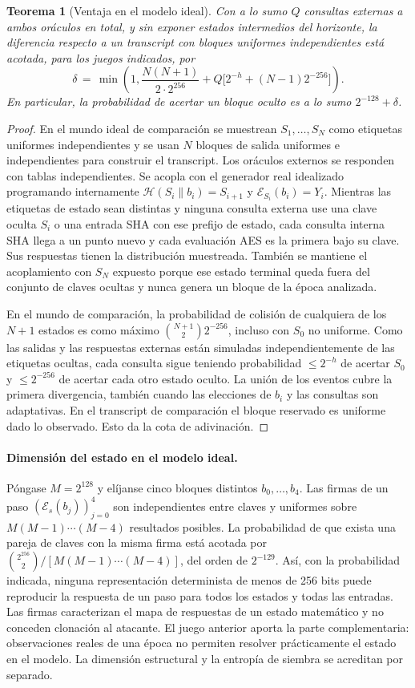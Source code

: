 \documentclass[11pt,a4paper]{article}
\newtheorem{theorem}{Teorema}
\begin{document}
\begin{theorem}[Ventaja en el modelo ideal]
Con a lo sumo $Q$ consultas externas a ambos oráculos en total,
y sin exponer estados intermedios del horizonte, la diferencia
respecto a un transcript con bloques uniformes independientes
está acotada, para los juegos indicados, por
\[
\delta\,=\,\min\left(1, \frac{N(N+1)}{2\cdot2^{256}}
 +Q\big[2^{-h}+(N-1)2^{-256}\big]\right).
\]
En particular, la probabilidad de acertar un bloque oculto es
a lo sumo $2^{-128}+\delta$.
\end{theorem}
\begin{proof}
En el mundo ideal de comparación se muestrean $S_1,\ldots,S_N$
como etiquetas uniformes independientes y se usan $N$ bloques
de salida uniformes e independientes para construir el
transcript. Los oráculos externos se responden con tablas
independientes. Se acopla con el generador real idealizado
programando internamente $\mathcal H(S_i\|b_i)=S_{i+1}$ y
$\mathcal E_{S_i}(b_i)=Y_i$. Mientras las etiquetas de estado sean
distintas y ninguna consulta externa use una clave oculta $S_i$
o una entrada SHA con ese prefijo de estado, cada consulta
interna SHA llega a un punto nuevo y cada evaluación AES es la
primera bajo su clave. Sus respuestas tienen la distribución
muestreada. También se mantiene el acoplamiento con $S_N$
expuesto porque ese estado terminal queda fuera del conjunto
de claves ocultas y nunca genera un bloque de la época analizada.

En el mundo de comparación, la probabilidad de colisión de
cualquiera de los $N+1$ estados es como máximo
$\binom{N+1}{2}2^{-256}$, incluso con $S_0$ no uniforme.
Como las salidas y las respuestas externas están simuladas
independientemente de las etiquetas ocultas, cada consulta
sigue teniendo probabilidad $\le2^{-h}$ de acertar $S_0$
y $\le2^{-256}$ de acertar cada otro estado oculto. La unión
de los eventos cubre la primera divergencia, también cuando
las elecciones de $b_i$ y las consultas son adaptativas.
En el transcript de comparación el bloque reservado es
uniforme dado lo observado. Esto da la cota de adivinación.
\end{proof}

\paragraph{Dimensión del estado en el modelo ideal.}
Póngase $M=2^{128}$ y elíjanse cinco bloques distintos $b_0,\ldots,b_4$.
Las firmas de un paso $(\mathcal E_s(b_j))_{j=0}^4$
son independientes entre claves y uniformes sobre $M(M-1)\cdots(M-4)$
resultados posibles. La probabilidad de que exista una pareja de
claves con la misma firma está acotada por
$\binom{2^{256}}{2}/[M(M-1)\cdots(M-4)]$, del orden de $2^{-129}$.
Así, con la probabilidad indicada, ninguna representación determinista
de menos de 256 bits puede reproducir la respuesta de un paso para todos
los estados y todas las entradas. Las firmas caracterizan el mapa de
respuestas de un estado matemático y no conceden clonación al atacante.
El juego anterior aporta la parte complementaria: observaciones reales
de una época no permiten resolver prácticamente el estado en el modelo.
La dimensión estructural y la entropía de siembra se acreditan por separado.
\end{document}
